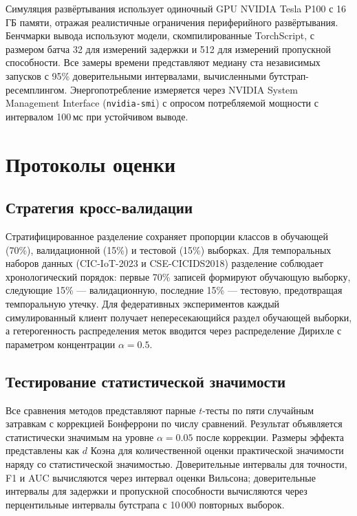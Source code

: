 Симуляция развёртывания использует одиночный GPU NVIDIA Tesla P100 с 16\,ГБ памяти, отражая реалистичные ограничения периферийного развёртывания. Бенчмарки вывода используют модели, скомпилированные TorchScript, с размером батча 32 для измерений задержки и 512 для измерений пропускной способности. Все замеры времени представляют медиану ста независимых запусков с 95\% доверительными интервалами, вычисленными бутстрап-ресемплингом. Энергопотребление измеряется через NVIDIA System Management Interface (\texttt{nvidia-smi}) с опросом потребляемой мощности с интервалом 100\,мс при устойчивом выводе.


\section{Протоколы оценки}
\label{app:eval_protocols}

\subsection{Стратегия кросс-валидации}
\label{app:cv}

Стратифицированное разделение сохраняет пропорции классов в обучающей (70\%), валидационной (15\%) и тестовой (15\%) выборках. Для темпоральных наборов данных (CIC-IoT-2023 и CSE-CICIDS2018) разделение соблюдает хронологический порядок: первые 70\% записей формируют обучающую выборку, следующие 15\% --- валидационную, последние 15\% --- тестовую, предотвращая темпоральную утечку. Для федеративных экспериментов каждый симулированный клиент получает непересекающийся раздел обучающей выборки, а гетерогенность распределения меток вводится через распределение Дирихле с параметром концентрации $\alpha=0.5$.


\subsection{Тестирование статистической значимости}
\label{app:significance}

Все сравнения методов представляют парные $t$-тесты по пяти случайным затравкам с коррекцией Бонферрони по числу сравнений. Результат объявляется статистически значимым на уровне $\alpha=0.05$ после коррекции. Размеры эффекта представлены как $d$ Коэна для количественной оценки практической значимости наряду со статистической значимостью. Доверительные интервалы для точности, F1 и AUC вычисляются через интервал оценки Вильсона; доверительные интервалы для задержки и пропускной способности вычисляются через перцентильные интервалы бутстрапа с 10\,000 повторных выборок.


